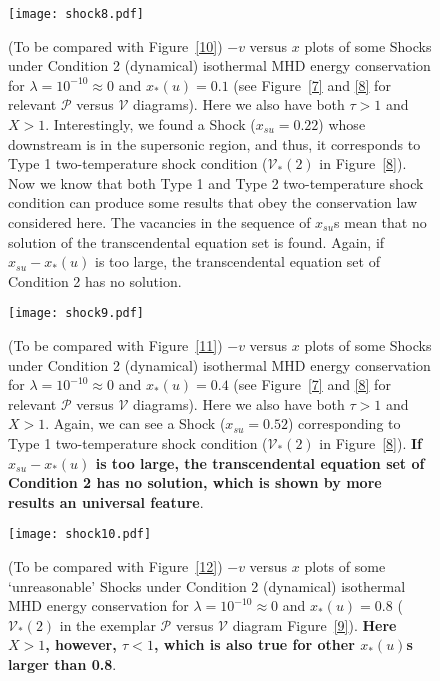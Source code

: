 \documentclass[fleqn,usenatbib]{mnras}
\begin{document}
\begin{figure}
\centering
\texttt{[image: shock8.pdf]}
\caption{(To be compared with Figure~\ref{10}) $-v$ versus $x$ plots of some Shocks under Condition 2 (dynamical) isothermal MHD energy conservation for $\lambda=10^{-10}\approx 0$ and $x_{*}(u)=0.1$ (see Figure~\ref{7} and \ref{8} for relevant $\mathcal{P}$ versus $\mathcal{V}$ diagrams). Here we also have both $\tau>1$ and $X>1$. Interestingly, we found a Shock ($x_{su}=0.22$) whose downstream is in the supersonic region, and thus, it corresponds to Type 1 two-temperature shock condition ($\mathcal{V}_{*}(2)$ in Figure~\ref{8}). Now we know that both Type 1 and Type 2 two-temperature shock condition can produce some results that obey the conservation law considered here. The vacancies in the sequence of $x_{su}$s mean that no solution of the transcendental equation set is found. Again, if $x_{su}-x_{*}(u)$ is too large, the transcendental equation set of Condition 2 has no solution. }
\label{2}
\end{figure}

\begin{figure}
\centering
\texttt{[image: shock9.pdf]}
\caption{(To be compared with Figure~\ref{11}) $-v$ versus $x$ plots of some Shocks under Condition 2 (dynamical) isothermal MHD energy conservation for $\lambda=10^{-10}\approx 0$ and $x_{*}(u)=0.4$ (see Figure~\ref{7} and \ref{8} for relevant $\mathcal{P}$ versus $\mathcal{V}$ diagrams). Here we also have both $\tau>1$ and $X>1$. Again, we can see a Shock ($x_{su}=0.52$) corresponding to Type 1 two-temperature shock condition ($\mathcal{V}_{*}(2)$ in Figure~\ref{8}). \textbf{If $x_{su}-x_{*}(u)$ is too large, the transcendental equation set of Condition 2 has no solution, which is shown by more results an universal feature}. }
\label{3}
\end{figure}

\begin{figure}
\centering
\texttt{[image: shock10.pdf]}
\caption{(To be compared with Figure~\ref{12}) $-v$ versus $x$ plots of some `unreasonable' Shocks under Condition 2 (dynamical) isothermal MHD energy conservation for $\lambda=10^{-10}\approx 0$ and $x_{*}(u)=0.8$ ($\mathcal{V}_{*}(2)$ in the exemplar $\mathcal{P}$ versus $\mathcal{V}$ diagram Figure~\ref{9}). \textbf{Here $X>1$, however, $\tau<1$, which is also true for other $x_{*}(u)$s larger than 0.8}.}
\label{4}
\end{figure}
\end{document}
